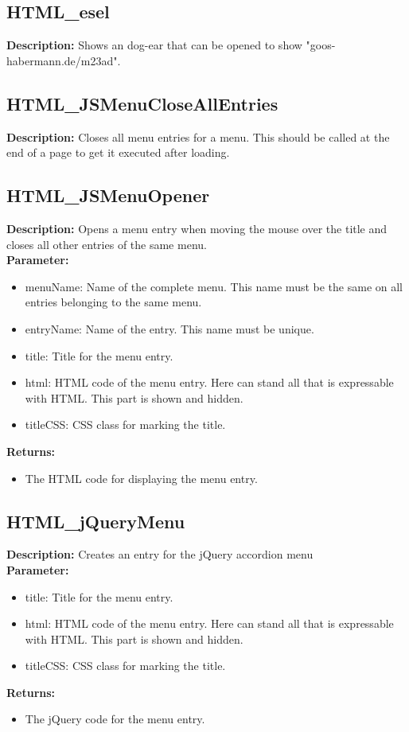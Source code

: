 \subsection{HTML\_esel}
\textbf{Description:} Shows an dog-ear that can be opened to show "goos-habermann.de/m23ad".\\

\subsection{HTML\_JSMenuCloseAllEntries}
\textbf{Description:} Closes all menu entries for a menu. This should be called at the end of a page to get it executed after loading.\\

\subsection{HTML\_JSMenuOpener}
\textbf{Description:} Opens a menu entry when moving the mouse over the title and closes all other entries of the same menu.\\
\textbf{Parameter:}
\begin{itemize}
\item menuName: Name of the complete menu. This name must be the same on all entries belonging to the same menu.
\item entryName: Name of the entry. This name must be unique.
\item title: Title for the menu entry.
\item html: HTML code of the menu entry. Here can stand all that is expressable with HTML. This part is shown and hidden.
\item titleCSS: CSS class for marking the title.
\end{itemize}
\textbf{Returns:}
\begin{itemize}
\item The HTML code for displaying the menu entry.
\end{itemize}

\subsection{HTML\_jQueryMenu}
\textbf{Description:} Creates an entry for the jQuery accordion menu\\
\textbf{Parameter:}
\begin{itemize}
\item title: Title for the menu entry.
\item html: HTML code of the menu entry. Here can stand all that is expressable with HTML. This part is shown and hidden.
\item titleCSS: CSS class for marking the title.
\end{itemize}
\textbf{Returns:}
\begin{itemize}
\item The jQuery code for the menu entry.
\end{itemize}

